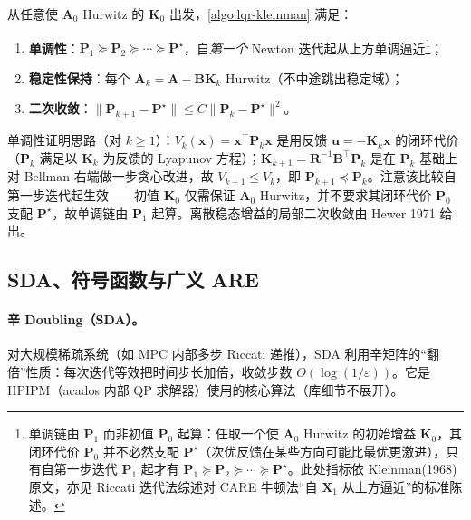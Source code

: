 \begin{theorem}\label{thm:lqr-kleinman-conv}
从任意使 $\mathbf A_0$ Hurwitz 的 $\mathbf K_0$ 出发，\cref{algo:lqr-kleinman} 满足：
\begin{enumerate}
  \item \textbf{单调性}：$\mathbf P_1\succeq\mathbf P_2\succeq\cdots\succeq\mathbf P^\star$，自\emph{第一个} Newton 迭代起从上方单调逼近\footnote{单调链由 $\mathbf P_1$ 而非初值 $\mathbf P_0$ 起算：任取一个使 $\mathbf A_0$ Hurwitz 的初始增益 $\mathbf K_0$，其闭环代价 $\mathbf P_0$ 并不必然支配 $\mathbf P^\star$（次优反馈在某些方向可能比最优更激进），只有自第一步迭代 $\mathbf P_1$ 起才有 $\mathbf P_1\succeq\mathbf P_2\succeq\cdots\succeq\mathbf P^\star$。此处指标依 Kleinman(1968)\cite{kleinman1968iterative} 原文，亦见 Riccati 迭代法综述对 CARE 牛顿法“自 $\mathbf X_1$ 从上方逼近”的标准陈述。}；
  \item \textbf{稳定性保持}：每个 $\mathbf A_k=\mathbf A-\mathbf B\mathbf K_k$ Hurwitz（不中途跳出稳定域）；
  \item \textbf{二次收敛}：$\|\mathbf P_{k+1}-\mathbf P^\star\|\le C\|\mathbf P_k-\mathbf P^\star\|^2$。
\end{enumerate}
\end{theorem}

单调性证明思路（对 $k\ge1$）：$V_k(\mathbf x)=\mathbf x^\top\mathbf P_k\mathbf x$ 是用反馈 $\mathbf u=-\mathbf K_k\mathbf x$ 的闭环代价（$\mathbf P_k$ 满足以 $\mathbf K_k$ 为反馈的 Lyapunov 方程）；$\mathbf K_{k+1}=\mathbf R^{-1}\mathbf B^\top\mathbf P_k$ 是在 $\mathbf P_k$ 基础上对 Bellman 右端做一步贪心改进，故 $V_{k+1}\le V_k$，即 $\mathbf P_{k+1}\preceq\mathbf P_k$。注意该比较自第一步迭代起生效——初值 $\mathbf K_0$ 仅需保证 $\mathbf A_0$ Hurwitz，并不要求其闭环代价 $\mathbf P_0$ 支配 $\mathbf P^\star$，故单调链由 $\mathbf P_1$ 起算。离散稳态增益的局部二次收敛由 Hewer 1971 给出。

\subsection{SDA、符号函数与广义 ARE}
\label{sec:lqr-sda-sign}

\paragraph{辛 Doubling（SDA）。}对大规模稀疏系统（如 MPC 内部多步 Riccati 递推），SDA 利用辛矩阵的“翻倍”性质：每次迭代等效把时间步长加倍，收敛步数 $O(\log(1/\varepsilon))$。它是 HPIPM（acados 内部 QP 求解器）使用的核心算法（库细节不展开）。


